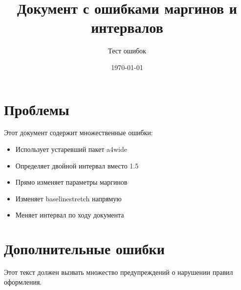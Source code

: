 \documentclass[12pt]{article}
\begin{document}
\title{Документ с ошибками маргинов и интервалов}
\author{Тест ошибок}
\date{\today}
\maketitle

\section{Проблемы}

Этот документ содержит множественные ошибки:

\linespread{1.2}
\selectfont

\begin{itemize}
    \item Использует устаревший пакет a4wide
    \item Определяет двойной интервал вместо 1.5
    \item Прямо изменяет параметры маргинов
    \item Изменяет baselinestretch напрямую
    \item Меняет интервал по ходу документа
\end{itemize}

\setlength{\textwidth}{15cm}

\section{Дополнительные ошибки}


Этот текст должен вызвать множество предупреждений о нарушении правил оформления.
\end{document}
